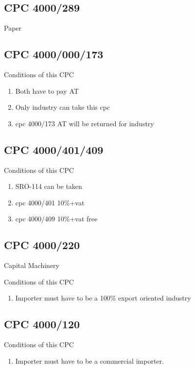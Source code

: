 \documentclass[10pt]{article}
\begin{document}
\subsection{CPC 4000/289}
    Paper

\subsection{CPC 4000/000/173}
\begin{description}
    \item [Conditions of this CPC]
\end{description}
\begin{enumerate}
        \item Both have to pay AT
        \item Only industry can take this cpc
        \item cpc 4000/173 AT will be returned for
            industry
\end{enumerate}

\subsection{CPC 4000/401/409}
\begin{description}
    \item [Conditions of this CPC]
\end{description}
\begin{enumerate}
        \item SRO-114 can be taken
        \item cpc 4000/401 10\%+vat
        \item cpc 4000/409 10\%+vat free
\end{enumerate}

\subsection{CPC 4000/220}
Capital Machinery
\begin{description}
    \item [Conditions of this CPC]
\end{description}
\begin{enumerate}
        \item Importer must have to be a 100\%
            export oriented industry
\end{enumerate}
\subsection{CPC 4000/120}
\begin{description}
    \item [Conditions of this CPC]
\end{description}
\begin{enumerate}
        \item Importer must have to be a
            commercial importer.
\end{enumerate}
\end{document}
